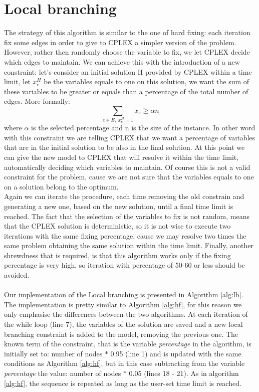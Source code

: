 \section{Local branching}
The strategy of this algorithm \cite{LB} is similar to the one of hard fixing: each iteration fix some edges in order to give to CPLEX a simpler version of the problem. However, rather then randomly choose the variable to fix, we let CPLEX decide which edges to maintain. We can achieve this with the introduction of a new constraint: let's consider an initial solution H provided by CPLEX within a time limit, let $x_e^H$ be the variables equals to one on this solution, we want the sum of these variables to be greater or equals than a percentage of the total number of edges. More formally:
\begin{equation*}
	\sum_{e \in E, \; x_e^H = 1} x_e \geq \alpha n
\end{equation*}
where $\alpha$ is the selected percentage and n is the size of the instance. In other word with this constraint we are telling CPLEX that we want a percentage of variables that are in the initial solution to be also in the final solution. At this point we can give the new model to CPLEX that will resolve it within the time limit, automatically deciding which variables to maintain.
Of course this is not a valid constraint for the problem, cause we are not sure that the variables equals to one on a solution belong to the optimum.\\
Again we can iterate the procedure, each time removing the old constrain and generating a new one, based on the new solution, until a final time limit is reached. The fact that the selection of the variables to fix is not random, means that the CPLEX solution is deterministic, so it is not wise to execute two iterations with the same fixing percentage, cause we may resolve two times the same problem obtaining the same solution within the time limit.
Finally, another shrewdness that is required, is that this algorithm works only if the fixing percentage is very high, so iteration with percentage of 50-60 or less should be avoided. 
\\\\ Our implementation of the Local branching is presented in Algorithm \ref{alg:lb}. The implementation is pretty similar to Algorithm \ref{alg:hf}, for this reason we only emphasise the differences between the two algorithms. 
At each iteration of the while loop (line 7), the variables of the solution are saved and a new local branching constraint is added to the model, removing the previous one. The known term of the constraint, that is the variable \textit{percentage} in the algorithm, is initially set to: number of nodes $\ast$ 0.95 (line 1) and is updated with the same conditions as Algorithm \ref{alg:hf}, but in this case subtracting from the variable \textit{percentage} the value: number of nodes $\ast$ 0.05 (lines 18 - 21). As in algorithm \ref{alg:hf}, the sequence is repeated as long as the user-set time limit is reached.

